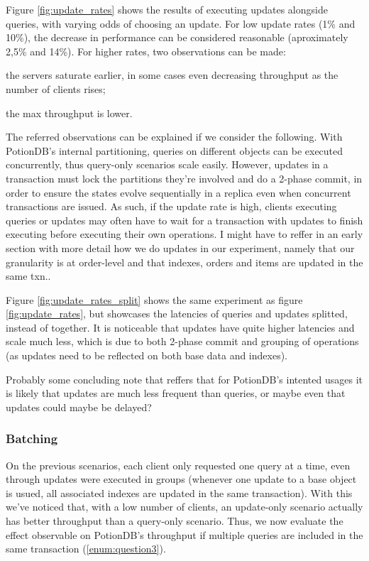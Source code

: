 \documentclass{vldb}
\newcommand{\grumbler}[2]{{\color{red}{\bf #1:} #2}}
\newcommand{\andre}[1]{\grumbler{andre}{#1}}
\begin{document}
Figure \ref{fig:update_rates} shows the results of executing updates alongside queries, with varying odds of choosing an update.
For low update rates (1\% and 10\%), the decrease in performance can be considered reasonable (aproximately 2,5\% and 14\%).
For higher rates, two observations can be made:
\begin{enumerate*}[label=(\roman*)]
	\item the servers saturate earlier, in some cases even decreasing throughput as the number of clients rises;
	\item the max throughput is lower.
\end{enumerate*}

The referred observations can be explained if we consider the following. 
With PotionDB's internal partitioning, queries on different objects can be executed concurrently, thus query-only scenarios scale easily. 
However, updates in a transaction must lock the partitions they're involved and do a 2-phase commit, in order to ensure the states evolve sequentially in a replica even when concurrent transactions are issued.
As such, if the update rate is high, clients executing queries or updates may often have to wait for a transaction with updates to finish executing before executing their own operations.
\andre{I might have to reffer in an early section with more detail how we do updates in our experiment, namely that our granularity is at order-level and that indexes, orders and items are updated in the same txn.}.

Figure \ref{fig:update_rates_split} shows the same experiment as figure \ref{fig:update_rates}, but showcases the latencies of queries and updates splitted, instead of together.
It is noticeable that updates have quite higher latencies and scale much less, which is due to both 2-phase commit and grouping of operations (as updates need to be reflected on both base data and indexes).


\andre{Probably some concluding note that reffers that for PotionDB's intented usages it is likely that updates are much less frequent than queries, or maybe even that updates could maybe be delayed?}

\subsubsection{Batching}

On the previous scenarios, each client only requested one query at a time, even through updates were executed in groups (whenever one update to a base object is usued, all associated indexes are updated in the same transaction).
With this we've noticed that, with a low number of clients, an update-only scenario actually has better throughput than a query-only scenario.
Thus, we now evaluate the effect observable on PotionDB's throughput if multiple queries are included in the same transaction (\ref{enum:question3}).
\end{document}
